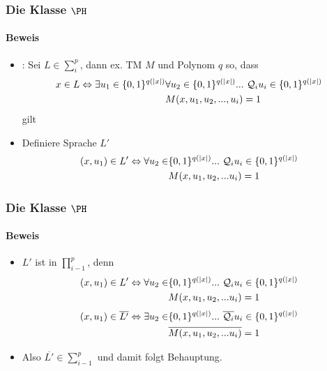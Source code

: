 	
\begin{frame}
	\frametitle{Die Klasse $\PH$}
	\framesubtitle{Beweis}
	\begin{itemize}[<+->]
		\item {}: Sei $L \in \sum_{i}^{p}$, dann ex. TM $M$ und Polynom $q$ so, dass \newline
		\begin{align}
			x \in L \Leftrightarrow  \exists u_1 \in \{0,1\}^{q(|x|)} &\forall u_2  \in \{0,1\}^{q(|x|)} ... \ \mathcal{Q}_i u_i \in \{0,1\}^{q(|x|)}  \notag \\
			&M(x,u_1,u_2,...,u_i)=1 \notag
		\end{align}
		gilt
		\bigskip
		\item Definiere Sprache $L'$
		\begin{align}
		(x,u_1) \in L' \Leftrightarrow \forall u_2 \in &\{0,1\}^{q(|x|)} ... \ \mathcal{Q}_i u_i \in \{0,1\}^{q(|x|)} \notag \\ &M(x,u_1,u_2, ... u_i) = 1 \notag 
		\end{align}
	
	\end{itemize}
\end{frame}
\begin{frame}
	\frametitle{Die Klasse $\PH$}
	\framesubtitle{Beweis}
	\begin{itemize}[<+->]
		\item $L'$ ist in $\prod_{i-1}^{p}$, denn
		\begin{align}
			(x,u_1) \in L' \Leftrightarrow \forall u_2 \in &\{0,1\}^{q(|x|)} ... \ \mathcal{Q}_i u_i \in \{0,1\}^{q(|x|)} \notag \\ &M(x,u_1,u_2, ... u_i) = 1 \notag 
		\end{align}
		\begin{align}
			(x,u_1) \in \overline{L'} \Leftrightarrow \exists u_2 \in &\{0,1\}^{q(|x|)} ... \ \overline{\mathcal{Q}_i} u_i \in \{0,1\}^{q(|x|)} \notag \\ &\overline{M(x,u_1,u_2, ... u_i)} = 1 \notag 
		\end{align}
		\item Also $\overline{L'} \in \sum_{i-1}^{p}$ und damit folgt Behauptung.
	\end{itemize}
\end{frame}

